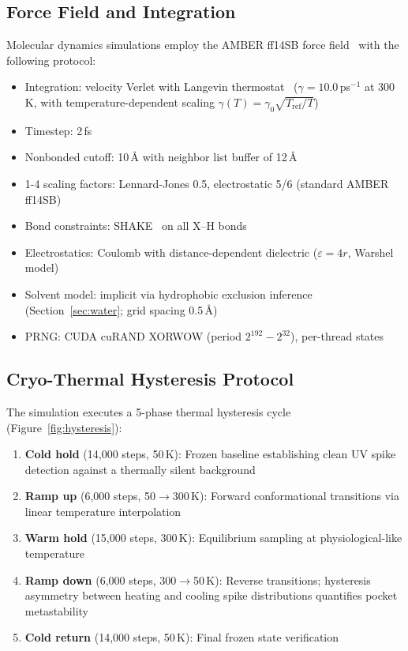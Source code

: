 \documentclass{sn-jnl}
\begin{document}
\subsection{Force Field and Integration}

Molecular dynamics simulations employ the AMBER ff14SB force field~\cite{maier2015} with the
following protocol:
\begin{itemize}[nosep,leftmargin=*]
  \item Integration: velocity Verlet with Langevin thermostat~\cite{izaguirre2001}
  ($\gamma = 10.0$\,ps$^{-1}$ at 300\,K, with temperature-dependent scaling
  $\gamma(T) = \gamma_0 \sqrt{T_{\text{ref}}/T}$)
  \item Timestep: 2\,fs
  \item Nonbonded cutoff: 10\,\AA{} with neighbor list buffer of 12\,\AA{}
  \item 1-4 scaling factors: Lennard-Jones 0.5, electrostatic 5/6 (standard AMBER ff14SB)
  \item Bond constraints: SHAKE~\cite{ryckaert1977} on all X--H bonds
  \item Electrostatics: Coulomb with distance-dependent dielectric
  ($\varepsilon = 4r$, Warshel model)
  \item Solvent model: implicit via hydrophobic exclusion inference
  (Section~\ref{sec:water}; grid spacing 0.5\,\AA{})
  \item PRNG: CUDA cuRAND XORWOW (period $2^{192} - 2^{32}$), per-thread states
\end{itemize}

\subsection{Cryo-Thermal Hysteresis Protocol}
\label{sec:cryo}

The simulation executes a 5-phase thermal hysteresis cycle (Figure~\ref{fig:hysteresis}):

\begin{enumerate}[nosep,leftmargin=*]
  \item \textbf{Cold hold} (14{,}000 steps, 50\,K): Frozen baseline establishing clean UV
  spike detection against a thermally silent background
  \item \textbf{Ramp up} (6{,}000 steps, 50$\to$300\,K): Forward conformational transitions
  via linear temperature interpolation
  \item \textbf{Warm hold} (15{,}000 steps, 300\,K): Equilibrium sampling at
  physiological-like temperature
  \item \textbf{Ramp down} (6{,}000 steps, 300$\to$50\,K): Reverse transitions; hysteresis
  asymmetry between heating and cooling spike distributions quantifies pocket metastability
  \item \textbf{Cold return} (14{,}000 steps, 50\,K): Final frozen state verification
\end{enumerate}
\end{document}
